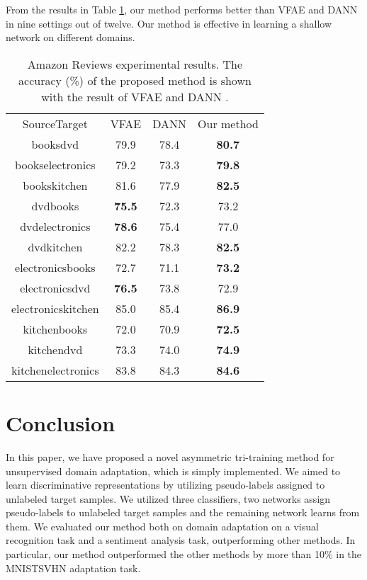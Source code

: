 \documentclass{article}
\begin{document}
From the results in Table \ref{table:amazon}, our method performs better than VFAE \cite{louizos2015variational} and DANN \cite{ganin2016domain} in nine settings out of twelve. Our method is effective in learning a shallow network on different domains. 
\begin{table}
\begin{center}
\begin{tabular}{c||c|c|c}
\toprule
\multirow{2}{*}{SourceTarget}&\multirow{2}{*}{VFAE}&\multirow{2}{*}{DANN}&\multirow{2}{*}{Our method}\\
&&&\\\midrule
booksdvd&79.9&78.4&{\bf 80.7}\\
 bookselectronics&79.2&73.3&{\bf 79.8}\\
 bookskitchen&81.6&77.9&{\bf82.5}\\
 dvdbooks&{\bf75.5}&72.3&73.2\\
 dvdelectronics&{\bf 78.6}&75.4&77.0\\
 dvdkitchen&82.2&78.3&{\bf 82.5}\\
 electronicsbooks&72.7&71.1&{\bf73.2}\\
 electronicsdvd&{\bf76.5}&73.8&72.9\\
 electronicskitchen&85.0&85.4&{\bf 86.9}\\
 kitchenbooks&72.0&70.9&{\bf 72.5}\\
 kitchendvd&73.3&74.0&{\bf 74.9}\\
 kitchenelectronics&83.8&84.3&{\bf 84.6}\\\bottomrule
\end{tabular}
\caption{Amazon Reviews experimental results. The accuracy (\%) of the proposed method is shown with the result of VFAE \cite{louizos2015variational} and DANN \cite{ganin2016domain}.}
\label{table:amazon}
\end{center}
\end{table}
\vspace{-2mm}
\section{Conclusion}
In this paper, we have proposed a novel asymmetric tri-training method for unsupervised domain adaptation, which is simply implemented. We aimed to learn discriminative representations by utilizing pseudo-labels assigned to unlabeled target samples. 
We utilized three classifiers, two networks assign pseudo-labels to unlabeled target samples and the remaining network learns from them.
We evaluated our method both on domain adaptation on a visual recognition task and a sentiment analysis task, outperforming other methods. In particular, our method outperformed the other methods by more than 10\% in the MNISTSVHN adaptation task.
\end{document}
